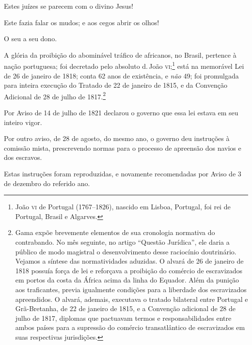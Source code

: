 Estes juízes se parecem com o divino Jesus!

Este fazia falar os mudos; e aos cegos abrir os olhos!

\asterisc

O seu a seu dono.

A glória da proibição do abominável tráfico de africanos, no Brasil,
pertence à nação portuguesa; foi decretado pelo absoluto d.\,João
\textsc{vi};\footnote{João \textsc{vi} de Portugal (1767--1826), nascido em Lisboa,
  Portugal, foi rei de Portugal, Brasil e Algarves.} está na memorável
Lei de 26 de janeiro de 1818; conta 62 anos de existência, e \emph{não}
49; foi promulgada para inteira execução do Tratado de 22 de janeiro de
1815, e da Convenção Adicional de 28 de julho de 1817.\footnote{Gama
  expõe brevemente elementos de sua cronologia normativa do contrabando.
  No mês seguinte, no artigo ``Questão Jurídica'', ele daria a
  público de modo magistral o desenvolvimento desse raciocínio
  doutrinário. Vejamos a síntese das normatividades aduzidas. O alvará
  de 26 de janeiro de 1818 possuía força de lei e reforçava a proibição do comércio
  de escravizados em portos da costa da África acima da linha do
  Equador. Além da punição aos traficantes, previa igualmente condições
  para a liberdade dos escravizados apreendidos. O alvará, ademais,
  executava o tratado bilateral entre Portugal e Grã-Bretanha, de
  22 de janeiro de 1815, e a Convenção adicional de 28 de julho de 1817, diplomas que
  pactuavam termos e responsabilidades entre ambos países para a
  supressão do comércio transatlântico de escravizados em suas
  respectivas jurisdições.}

Por Aviso de 14 de julho de 1821 declarou o governo que essa lei estava
em seu inteiro vigor.

Por outro aviso, de 28 de agosto, do mesmo ano, o governo deu instruções
à comissão mista, prescrevendo normas para o processo de apreensão dos
navios e dos escravos.

Estas instruções foram reproduzidas, e novamente recomendadas por Aviso
de 3 de dezembro do referido ano.

